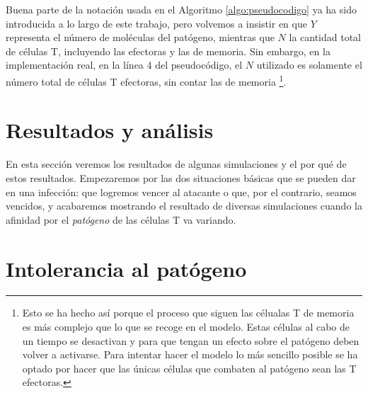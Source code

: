 Buena parte de la notación usada en el Algoritmo \ref{algo:pseudocodigo} ya ha sido introducida a lo largo de este trabajo, pero volvemos a insistir en que $Y$ representa el número de moléculas del patógeno, mientras que $N$ la cantidad total de células T, incluyendo las efectoras y las de memoria. Sin embargo, en la implementación real, en la línea 4 del pseudocódigo, el $N$ utilizado es solamente el número total de células T efectoras, sin contar las de memoria \footnote{Esto se ha hecho así porque el proceso que siguen las célualas T de memoria es más complejo que lo que se recoge en el modelo. Estas células al cabo de un tiempo se desactivan y para que tengan un efecto sobre el patógeno deben volver a activarse. Para intentar hacer el modelo lo más sencillo posible se ha optado por hacer que las únicas células que combaten al patógeno sean las T efectoras.}.

\section{Resultados y análisis}

En esta sección  veremos los resultados de algunas simulaciones y el por qué de estos resultados. Empezaremos por las dos situaciones básicas que se pueden dar en una infección: que logremos vencer al atacante o que, por el contrario, seamos vencidos, y acabaremos mostrando el resultado de diversas simulaciones cuando la afinidad por el \textit{patógeno} de las células T va variando.

\section{Intolerancia al patógeno}

